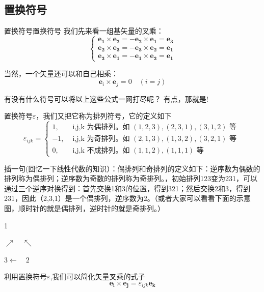 \documentclass{ctexart}
\begin{document}
\subsection{置换符号}

     \begin{定义}{置换符号}{置换符号}
    我们先来看一组基矢量的叉乘：
    $$
    \left\{\begin{array}{ll}
     \boldsymbol{e_{1}} \times \boldsymbol{e_{2}}=-\boldsymbol{e_{2}} \times \boldsymbol{e_{1}}=\boldsymbol{e_{3}} \\
    \boldsymbol{e_{2}} \times \boldsymbol{e_{3}}=- \boldsymbol{e_{3}}\times \boldsymbol{e_{2}}=\boldsymbol{e_{1}} \\
     \boldsymbol{e_{3}} \times \boldsymbol{e_{1}}=-\boldsymbol{e_{1}} \times \boldsymbol{e_{3}}=\boldsymbol{e_{1}}
     \end{array}\right.
     $$
     \par
     当然，一个矢量还可以和自己相乘：
     $$
     \boldsymbol{e}_{i} \times \boldsymbol{e}_{j}=0 \quad(i=j)
     $$\par
     有没有什么符号可以将以上这些公式一网打尽呢？
     有点，那就是!
     \par
     置换符号$\varepsilon $，我们又把它称为排列符号，它的定义如下
     $$
     \varepsilon_{i j k}=\left\{\begin{array}{ll}
     1, & \text { i,j,k 为偶排列。如 }(1,2,3),(2,3,1),(3,1,2) \text { 等 } \\
    -1, & \text { i,j,k 为奇排列。如 }(2,1,3),(1,3,2),(3,2,1) \text { 等 } \\
    0, & \text { i,j,k 不成排列。如 }(1,1,2),(1,1,1) \text { 等 }
     \end{array}\right.
    $$
    \par
    插一句(回忆一下线性代数的知识）：偶排列和奇排列的定义如下：逆序数为偶数的排列称为偶排列；逆序数为奇数的排列称为奇排列。，初始排列123变为231，可以通过三个逆序对换得到：首先交换1和3的位置，得到321；然后交换2和3，得到231，因此（2,3,1）是一个偶排列，逆序数为2。（或者大家可以看看下面的示意图，顺时针的就是偶排列，逆时针的就是奇排列。）
    \begin{center}
        1 \quad
     \end{center}
    \begin{center}
      $  \nearrow \quad \nwarrow $
     \end{center}
     \begin{center}
       $3 \longleftarrow \quad  2 $
     \end{center}
    \par
    利用置换符号$\varepsilon$,我们可以简化矢量叉乘的式子
    $$ 
    \boldsymbol{e_i} \times \boldsymbol{e_j}=\varepsilon_{i j k}\boldsymbol{e_k}
    $$
    \end{定义}
\end{document}
